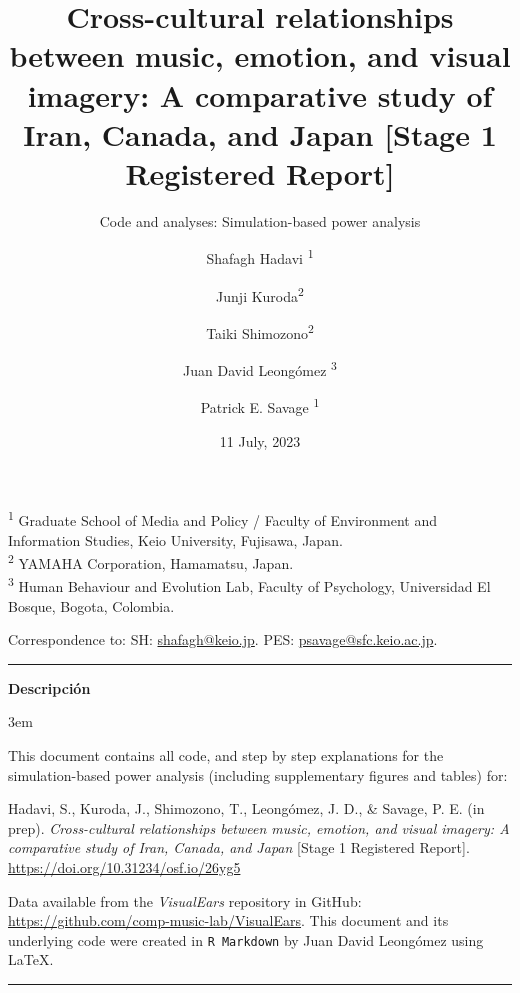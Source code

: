 \documentclass[
  bookmarksnumbered]{article}
\title{Cross-cultural relationships between music, emotion, and visual imagery: A comparative study of Iran, Canada, and Japan {[}Stage 1 Registered Report{]}}
\subtitle{Code and analyses: Simulation-based power analysis}
\author{Shafagh Hadavi \orcidlink{0009-0008-1184-7238}\textsuperscript{1} \and Junji Kuroda\textsuperscript{2} \and Taiki Shimozono\textsuperscript{2} \and Juan David Leongómez \orcidlink{0000-0002-0092-6298}\textsuperscript{3} \and Patrick E. Savage \orcidlink{0000-0001-6996-7496}\textsuperscript{1}}
\date{11 July, 2023}
\begin{document}
\maketitle

\textsuperscript{1} Graduate School of Media and Policy / Faculty of Environment and Information Studies, Keio University, Fujisawa, Japan.\\
\textsuperscript{2} YAMAHA Corporation, Hamamatsu, Japan.\\
\textsuperscript{3} Human Behaviour and Evolution Lab, Faculty of Psychology, Universidad El Bosque, Bogota, Colombia.

\begin{center}
Correspondence to:
SH: \href{mailto:shafagh@keio.jp}{shafagh@keio.jp}. 
PES: \href{mailto:psavage@sfc.keio.ac.jp}{psavage@sfc.keio.ac.jp}.

\begin{center}\rule{0.5\linewidth}{0.5pt}\end{center}

\textbf{Descripción}
\end{center}

\par
\begingroup
\leftskip3em
\rightskip\leftskip

This document contains all code, and step by step explanations for the simulation-based power analysis (including supplementary figures and tables) for:

\begin{hangparas}{.25in}{1}
Hadavi, S., Kuroda, J., Shimozono, T., Leongómez, J. D., \& Savage, P. E. (in prep). \textit{Cross-cultural relationships between music, emotion, and visual imagery: A comparative study of Iran, Canada, and Japan} [Stage 1 Registered Report]. \url{https://doi.org/10.31234/osf.io/26yg5}
\end{hangparas}

Data available from the \emph{VisualEars} repository in GitHub: \url{https://github.com/comp-music-lab/VisualEars}. This document and its underlying code were created in \texttt{R\ Markdown} by Juan David Leongómez using \LaTeX.

\begin{center}\rule{0.5\linewidth}{0.5pt}\end{center}

\par
\endgroup

{\hypersetup{hidelinks}
\setcounter{tocdepth}{6}
\tableofcontents
}
\opensupplement
\end{document}
